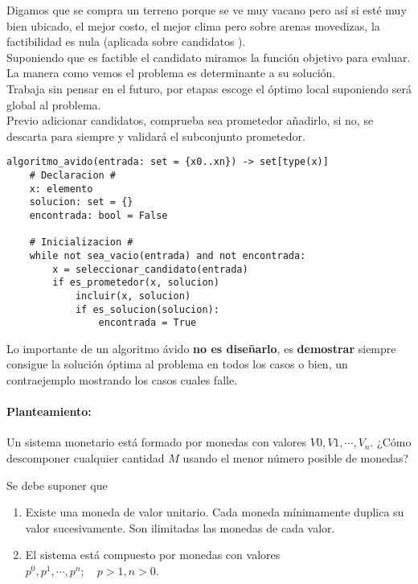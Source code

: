 \documentclass[tikz,11pt,fleqn]{book} %
\begin{document}
Digamos que se compra un terreno porque se ve muy vacano pero así si esté muy bien ubicado, el mejor costo, el mejor clima pero sobre arenas movedizas, la factibilidad es nula (aplicada sobre candidatos
).\\
Suponiendo que es factible el candidato miramos la función objetivo para evaluar.
\\
La manera como vemos el problema es determinante a su solución.
\\

Trabaja sin pensar en el futuro, por etapas escoge el óptimo local suponiendo será global al problema.\\
Previo adicionar candidatos, comprueba sea prometedor añadirlo, si no, se descarta para siempre y validará el subconjunto prometedor.

\begin{lstlisting}
algoritmo_avido(entrada: set = {x0..xn}) -> set[type(x)]
    # Declaracion #
    x: elemento
    solucion: set = {}
    encontrada: bool = False
    
    # Inicializacion #
    while not sea_vacio(entrada) and not encontrada:
        x = seleccionar_candidato(entrada)
        if es_prometedor(x, solucion)
            incluir(x, solucion)
            if es_solucion(solucion):
                encontrada = True
\end{lstlisting}


Lo importante de un algoritmo ávido \textbf{no es diseñarlo}, es \textbf{demostrar} siempre consigue la solución óptima al problema en todos los casos o bien, un contraejemplo mostrando los casos cuales falle.

\begin{example}
	\paragraph{Planteamiento:}
	\begin{definition}
		Un sistema monetario está formado por monedas con valores $V0, V1, \cdots, V_n$. ¿Cómo descomponer cualquier cantidad $M$ usando el menor número posible de monedas?

		Se debe suponer que
		\begin{enumerate}
			\item Existe una moneda de valor unitario. Cada moneda mínimamente duplica su valor sucesivamente. Son ilimitadas las monedas de cada valor.
			\item El sistema está compuesto por monedas con valores $p^0,p^1,\cdots,p^n;\quad p>1,n>0$.
		\end{enumerate}
	\end{definition}
\end{example}
\end{document}
